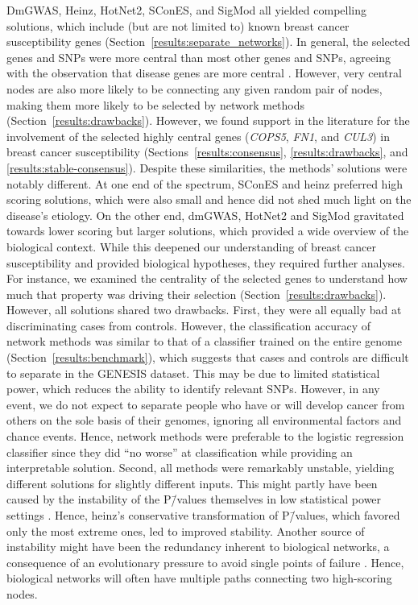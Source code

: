 \documentclass[10pt,letterpaper]{article}
\begin{document}
DmGWAS, Heinz, HotNet2, SConES, and SigMod all yielded compelling solutions, which include (but are not limited to) known breast cancer susceptibility genes (Section~\ref{results:separate_networks}). In general, the selected genes and SNPs were more central than most other genes and SNPs, agreeing with the observation that disease genes are more central \cite{pinero_uncovering_2016}. However, very central nodes are also more likely to be connecting any given random pair of nodes, making them more likely to be selected by network methods (Section~\ref{results:drawbacks}). However, we found support in the literature for the involvement of the selected highly central genes (\emph{COPS5}, \emph{FN1}, and \emph{CUL3}) in breast cancer susceptibility (Sections~\ref{results:consensus}, \ref{results:drawbacks}, and \ref{results:stable-consensus}). Despite these similarities, the methods' solutions were notably different. At one end of the spectrum, SConES and heinz preferred high scoring solutions, which were also small and hence did not shed much light on the disease's etiology. On the other end, dmGWAS, HotNet2 and SigMod gravitated towards lower scoring but larger solutions, which provided a wide overview of the biological context. While this deepened our understanding of breast cancer susceptibility and provided biological hypotheses, they required further analyses. For instance, we examined the centrality of the selected genes to understand how much that property was driving their selection (Section~\ref{results:drawbacks}). However, all solutions shared two drawbacks. First, they were all equally bad at discriminating cases from controls. However, the classification accuracy of network methods was similar to that of a classifier trained on the entire genome (Section~\ref{results:benchmark}), which suggests that cases and controls are difficult to separate in the GENESIS dataset. This may be due to limited statistical power, which reduces the ability to identify relevant SNPs. However, in any event, we do not expect to separate people who have or will develop cancer from others on the sole basis of their genomes, ignoring all environmental factors and chance events. Hence, network methods were preferable to the logistic regression classifier since they did ``no worse'' at classification while providing an interpretable solution. Second, all methods were remarkably unstable, yielding different solutions for slightly different inputs. This might partly have been caused by the instability of the P\=/values themselves in low statistical power settings \cite{halseyFickleValueGenerates2015}. Hence, heinz's conservative transformation of P\=/values, which favored only the most extreme ones, led to improved stability. Another source of instability might have been the redundancy inherent to biological networks, a consequence of an evolutionary pressure to avoid single points of failure \cite{wagnerAlternativeRoutesMutational2007}. Hence, biological networks will often have multiple paths connecting two high-scoring nodes. 
\end{document}
